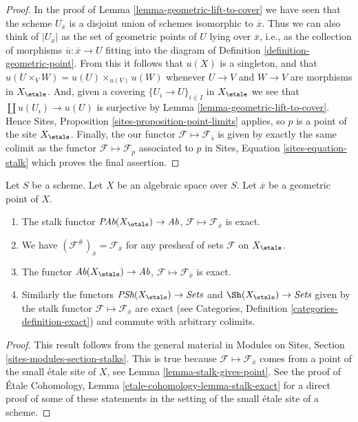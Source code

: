 \begin{proof}
In the proof of
Lemma \ref{lemma-geometric-lift-to-cover}
we have seen that the scheme $U_{\overline{x}}$ is a disjoint union of
schemes isomorphic to $\overline{x}$. Thus we can also think of
$|U_{\overline{x}}|$ as the set of geometric points of $U$ lying over
$\overline{x}$, i.e., as the collection of morphisms
$\overline{u} : \overline{x} \to U$ fitting into the diagram of
Definition \ref{definition-geometric-point}.
From this it follows that $u(X)$ is a singleton, and that
$u(U \times_V W) = u(U) \times_{u(V)} u(W)$
whenever $U \to V$ and $W \to V$ are morphisms in $X_\etale$.
And, given a covering $\{U_i \to U\}_{i \in I}$ in $X_\etale$ we see
that $\coprod u(U_i) \to u(U)$ is surjective by
Lemma \ref{lemma-geometric-lift-to-cover}.
Hence
Sites, Proposition \ref{sites-proposition-point-limits}
applies, so $p$ is a point of the site $X_\etale$.
Finally, the our functor $\mathcal{F} \mapsto \mathcal{F}_{\overline{s}}$
is given by exactly the same colimit as the functor
$\mathcal{F} \mapsto \mathcal{F}_p$ associated to $p$ in
Sites, Equation \ref{sites-equation-stalk}
which proves the final assertion.
\end{proof}

\begin{lemma}
\label{lemma-stalk-exact}
Let $S$ be a scheme.
Let $X$ be an algebraic space over $S$.
Let $\overline{x}$ be a geometric point of $X$.
\begin{enumerate}
\item The stalk functor
$\textit{PAb}(X_\etale) \to \textit{Ab}$,
$\mathcal{F}  \mapsto  \mathcal{F}_{\overline{x}}$
is exact.
\item We have $(\mathcal{F}^\#)_{\overline{x}} = \mathcal{F}_{\overline{x}}$
for any presheaf of sets $\mathcal{F}$ on $X_\etale$.
\item The functor
$\textit{Ab}(X_\etale) \to \textit{Ab}$,
$\mathcal{F} \mapsto \mathcal{F}_{\overline{x}}$ is exact.
\item Similarly the functors
$\textit{PSh}(X_\etale) \to \textit{Sets}$ and
$\Sh(X_\etale) \to \textit{Sets}$ given by the stalk functor
$\mathcal{F} \mapsto \mathcal{F}_{\overline{x}}$ are exact (see
Categories, Definition \ref{categories-definition-exact})
and commute with arbitrary colimits.
\end{enumerate}
\end{lemma}

\begin{proof}
This result follows from the general material in
Modules on Sites, Section \ref{sites-modules-section-stalks}.
This is true because $\mathcal{F} \mapsto \mathcal{F}_{\overline{x}}$
comes from a point of the small \'etale site of $X$, see
Lemma \ref{lemma-stalk-gives-point}. See the proof of
\'Etale Cohomology, Lemma \ref{etale-cohomology-lemma-stalk-exact}
for a direct proof of some of these statements in the setting of
the small \'etale site of a scheme.
\end{proof}

